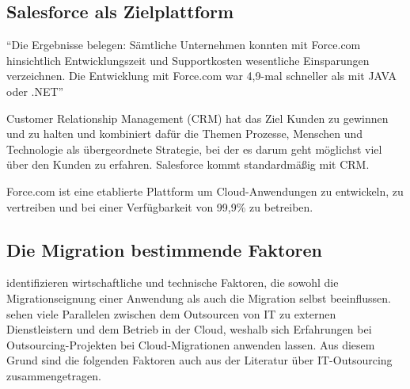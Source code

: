 \subsection{Salesforce als Zielplattform}
\label{cha:salesforce_als_zielplattform}
"`Die Ergebnisse belegen: Sämtliche Unternehmen konnten mit Force.com 
hinsichtlich Entwicklungszeit und Supportkosten wesentliche Einsparungen 
verzeichnen. Die Entwicklung mit Force.com war 4,9-mal schneller als mit JAVA 
oder .NET"' 

Customer Relationship Management (CRM) hat das Ziel Kunden zu gewinnen und zu 
halten  und kombiniert dafür die Themen Prozesse, Menschen und Technologie als 
übergeordnete Strategie, bei der es darum geht möglichst viel über den Kunden 
zu erfahren. Salesforce kommt standardmäßig mit CRM. 

Force.com ist eine etablierte Plattform um Cloud-Anwendungen zu entwickeln, zu 
vertreiben und bei einer Verfügbarkeit von 99,9\% zu betreiben. 

\subsection{Die Migration bestimmende Faktoren}
\label{cha:migration_bestimmende_faktoren}
 identifizieren wirtschaftliche und technische Faktoren, 
die sowohl die Migrationseignung einer Anwendung als auch die Migration selbst 
beeinflussen. \\
 sehen viele 
Parallelen zwischen dem Outsourcen von IT zu externen 
Dienstleistern und dem Betrieb in der Cloud, weshalb sich Erfahrungen bei 
Outsourcing-Projekten bei Cloud-Migrationen 
anwenden lassen. Aus diesem Grund sind die folgenden Faktoren auch aus der
Literatur über IT-Outsourcing zusammengetragen.
